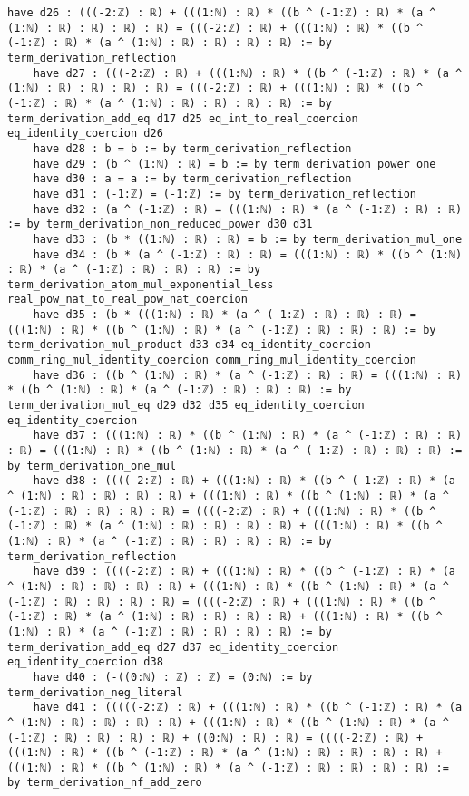 \documentclass{article}
\begin{document}
\begin{tcolorbox}[colback=white!10, width=\linewidth]
\begin{lstlisting}[language=Lean4]
    have d26 : (((-2:ℤ) : ℝ) + (((1:ℕ) : ℝ) * ((b ^ (-1:ℤ) : ℝ) * (a ^ (1:ℕ) : ℝ) : ℝ) : ℝ) : ℝ) = (((-2:ℤ) : ℝ) + (((1:ℕ) : ℝ) * ((b ^ (-1:ℤ) : ℝ) * (a ^ (1:ℕ) : ℝ) : ℝ) : ℝ) : ℝ) := by term_derivation_reflection
    have d27 : (((-2:ℤ) : ℝ) + (((1:ℕ) : ℝ) * ((b ^ (-1:ℤ) : ℝ) * (a ^ (1:ℕ) : ℝ) : ℝ) : ℝ) : ℝ) = (((-2:ℤ) : ℝ) + (((1:ℕ) : ℝ) * ((b ^ (-1:ℤ) : ℝ) * (a ^ (1:ℕ) : ℝ) : ℝ) : ℝ) : ℝ) := by term_derivation_add_eq d17 d25 eq_int_to_real_coercion eq_identity_coercion d26
    have d28 : b = b := by term_derivation_reflection
    have d29 : (b ^ (1:ℕ) : ℝ) = b := by term_derivation_power_one
    have d30 : a = a := by term_derivation_reflection
    have d31 : (-1:ℤ) = (-1:ℤ) := by term_derivation_reflection
    have d32 : (a ^ (-1:ℤ) : ℝ) = (((1:ℕ) : ℝ) * (a ^ (-1:ℤ) : ℝ) : ℝ) := by term_derivation_non_reduced_power d30 d31
    have d33 : (b * ((1:ℕ) : ℝ) : ℝ) = b := by term_derivation_mul_one
    have d34 : (b * (a ^ (-1:ℤ) : ℝ) : ℝ) = (((1:ℕ) : ℝ) * ((b ^ (1:ℕ) : ℝ) * (a ^ (-1:ℤ) : ℝ) : ℝ) : ℝ) := by term_derivation_atom_mul_exponential_less real_pow_nat_to_real_pow_nat_coercion
    have d35 : (b * (((1:ℕ) : ℝ) * (a ^ (-1:ℤ) : ℝ) : ℝ) : ℝ) = (((1:ℕ) : ℝ) * ((b ^ (1:ℕ) : ℝ) * (a ^ (-1:ℤ) : ℝ) : ℝ) : ℝ) := by term_derivation_mul_product d33 d34 eq_identity_coercion comm_ring_mul_identity_coercion comm_ring_mul_identity_coercion
    have d36 : ((b ^ (1:ℕ) : ℝ) * (a ^ (-1:ℤ) : ℝ) : ℝ) = (((1:ℕ) : ℝ) * ((b ^ (1:ℕ) : ℝ) * (a ^ (-1:ℤ) : ℝ) : ℝ) : ℝ) := by term_derivation_mul_eq d29 d32 d35 eq_identity_coercion eq_identity_coercion
    have d37 : (((1:ℕ) : ℝ) * ((b ^ (1:ℕ) : ℝ) * (a ^ (-1:ℤ) : ℝ) : ℝ) : ℝ) = (((1:ℕ) : ℝ) * ((b ^ (1:ℕ) : ℝ) * (a ^ (-1:ℤ) : ℝ) : ℝ) : ℝ) := by term_derivation_one_mul
    have d38 : ((((-2:ℤ) : ℝ) + (((1:ℕ) : ℝ) * ((b ^ (-1:ℤ) : ℝ) * (a ^ (1:ℕ) : ℝ) : ℝ) : ℝ) : ℝ) + (((1:ℕ) : ℝ) * ((b ^ (1:ℕ) : ℝ) * (a ^ (-1:ℤ) : ℝ) : ℝ) : ℝ) : ℝ) = ((((-2:ℤ) : ℝ) + (((1:ℕ) : ℝ) * ((b ^ (-1:ℤ) : ℝ) * (a ^ (1:ℕ) : ℝ) : ℝ) : ℝ) : ℝ) + (((1:ℕ) : ℝ) * ((b ^ (1:ℕ) : ℝ) * (a ^ (-1:ℤ) : ℝ) : ℝ) : ℝ) : ℝ) := by term_derivation_reflection
    have d39 : ((((-2:ℤ) : ℝ) + (((1:ℕ) : ℝ) * ((b ^ (-1:ℤ) : ℝ) * (a ^ (1:ℕ) : ℝ) : ℝ) : ℝ) : ℝ) + (((1:ℕ) : ℝ) * ((b ^ (1:ℕ) : ℝ) * (a ^ (-1:ℤ) : ℝ) : ℝ) : ℝ) : ℝ) = ((((-2:ℤ) : ℝ) + (((1:ℕ) : ℝ) * ((b ^ (-1:ℤ) : ℝ) * (a ^ (1:ℕ) : ℝ) : ℝ) : ℝ) : ℝ) + (((1:ℕ) : ℝ) * ((b ^ (1:ℕ) : ℝ) * (a ^ (-1:ℤ) : ℝ) : ℝ) : ℝ) : ℝ) := by term_derivation_add_eq d27 d37 eq_identity_coercion eq_identity_coercion d38
    have d40 : (-((0:ℕ) : ℤ) : ℤ) = (0:ℕ) := by term_derivation_neg_literal
    have d41 : (((((-2:ℤ) : ℝ) + (((1:ℕ) : ℝ) * ((b ^ (-1:ℤ) : ℝ) * (a ^ (1:ℕ) : ℝ) : ℝ) : ℝ) : ℝ) + (((1:ℕ) : ℝ) * ((b ^ (1:ℕ) : ℝ) * (a ^ (-1:ℤ) : ℝ) : ℝ) : ℝ) : ℝ) + ((0:ℕ) : ℝ) : ℝ) = ((((-2:ℤ) : ℝ) + (((1:ℕ) : ℝ) * ((b ^ (-1:ℤ) : ℝ) * (a ^ (1:ℕ) : ℝ) : ℝ) : ℝ) : ℝ) + (((1:ℕ) : ℝ) * ((b ^ (1:ℕ) : ℝ) * (a ^ (-1:ℤ) : ℝ) : ℝ) : ℝ) : ℝ) := by term_derivation_nf_add_zero

\end{lstlisting}
\end{tcolorbox}
\end{document}

